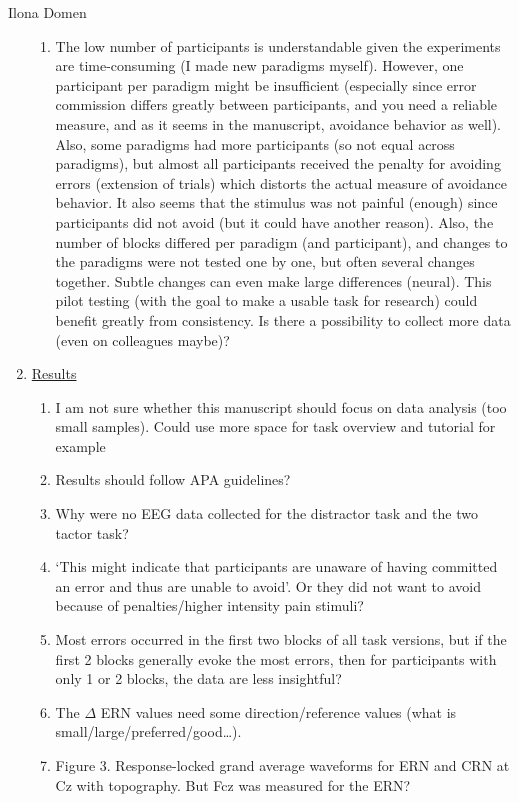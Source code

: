 \documentclass[twocolumn, serif, authordate, review]{jote-article}
\begin{document}
\begin{paracol}{2}
\begin{reviewend}{Ilona Domen}
\begin{enumerate}[label=\textbf{\arabic*}), start=0]
\begin{enumerate}
            \item The low number of participants is understandable given the experiments are time-consuming (I made new paradigms myself). However, one participant per paradigm might be insufficient (especially since error commission differs greatly between participants, and you need a reliable measure, and as it seems in the manuscript, avoidance behavior as well). Also, some paradigms had more participants (so not equal across paradigms), but almost all participants received the penalty for avoiding errors (extension of trials) which distorts the actual measure of avoidance behavior. It also seems that the stimulus was not painful (enough) since participants did not avoid (but it could have another reason). Also, the number of blocks differed per paradigm (and participant), and changes to the paradigms were not tested one by one, but often several changes together. Subtle changes can even make large differences (neural). This pilot testing (with the goal to make a usable task for research) could benefit greatly from consistency. Is there a possibility to collect more data (even on colleagues maybe)?
        \end{enumerate}

    \item \hyperref[sec:results]{Results}
        \begin{enumerate}
            \item I am not sure whether this manuscript should focus on data analysis (too small samples). Could use more space for task overview and tutorial for example
            \item Results should follow APA guidelines?
            \item Why were no EEG data collected for the distractor task and the two tactor task?
            \item `This might indicate that participants are unaware of having committed an error and thus are unable to avoid'. Or they did not want to avoid because of penalties/higher intensity pain stimuli?
            \item Most errors occurred in the first two blocks of all task versions, but if the first 2 blocks generally evoke the most errors, then for participants with only 1 or 2 blocks, the data are less insightful?
            \item The $\Delta$ ERN values need some direction/reference values (what is small/large/preferred/good{\dots}).
            \item Figure 3. Response-locked grand average waveforms for ERN and CRN at Cz with topography. But Fcz was measured for the ERN?
        \end{enumerate}
        

\end{enumerate}
\end{reviewend}
\end{paracol}
\end{document}
